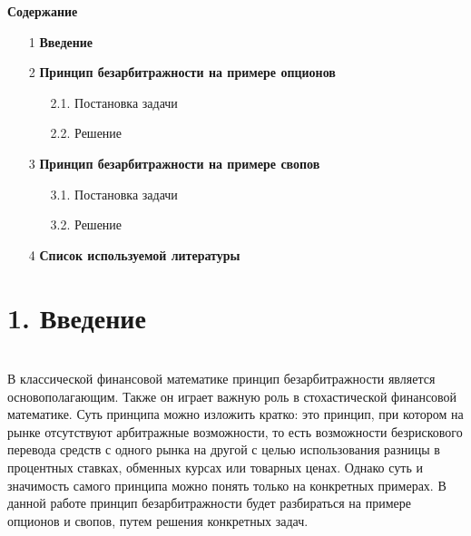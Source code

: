 \documentclass[12pt,a4 paper]{book}
\begin{document}
\smallskip
\begin{center}
{\bf\Large Содержание}
\end{center}
\begin{enumerate}
\item[1] \textbf{Введение} 

\item[2] \textbf{Принцип безарбитражности на примере опционов}
\begin{enumerate}
\item[2.1.] Постановка задачи
\item[2.2.] Решение
\end{enumerate}
\item[3] \textbf{Принцип безарбитражности на примере свопов}
\begin{enumerate}
\item[3.1.] Постановка задачи
\item[3.2.] Решение
\end{enumerate}
\item[4] \textbf{Список используемой литературы}
\end{enumerate}

\newpage
\section*{1. Введение}
\smallskip
\\В классической финансовой математике принцип безарбитражности является основополагающим. Также он играет важную роль в стохастической финансовой математике. Суть принципа можно изложить кратко: это принцип, при котором на рынке отсутствуют арбитражные возможности, то есть возможности безрискового перевода средств с одного рынка на другой с целью использования разницы в процентных ставках, обменных курсах или товарных ценах. Однако суть и значимость самого принципа можно понять только на конкретных примерах. В данной работе принцип безарбитражности будет разбираться на примере опционов и свопов, путем решения конкретных задач.

\newpage
\end{document}
